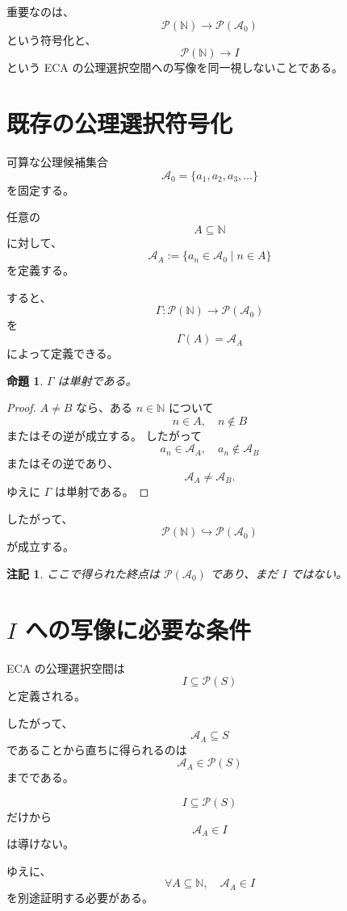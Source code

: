 \documentclass[a4paper,11pt]{article}
\newtheorem{proposition}[definition]{命題}
\newtheorem{remark}[definition]{注記}
\begin{document}
重要なのは、
\[
\mathcal{P}(\mathbb{N})\to\mathcal{P}(\mathcal{A}_0)
\]
という符号化と、
\[
\mathcal{P}(\mathbb{N})\to I
\]
という ECA の公理選択空間への写像を同一視しないことである。

\section{既存の公理選択符号化}

可算な公理候補集合
\[
\mathcal{A}_0=\{a_1,a_2,a_3,\ldots\}
\]
を固定する。

任意の
\[
A\subseteq\mathbb{N}
\]
に対して、
\[
\mathcal{A}_A
:=
\{a_n\in\mathcal{A}_0\mid n\in A\}
\]
を定義する。

すると、
\[
\Gamma:
\mathcal{P}(\mathbb{N})
\longrightarrow
\mathcal{P}(\mathcal{A}_0)
\]
を
\[
\Gamma(A)=\mathcal{A}_A
\]
によって定義できる。

\begin{proposition}
$\Gamma$ は単射である。
\end{proposition}

\begin{proof}
$A\neq B$ なら、ある $n\in\mathbb{N}$ について
\[
n\in A,\quad n\notin B
\]
またはその逆が成立する。
したがって
\[
a_n\in\mathcal{A}_A,\quad
a_n\notin\mathcal{A}_B
\]
またはその逆であり、
\[
\mathcal{A}_A\neq\mathcal{A}_B.
\]
ゆえに $\Gamma$ は単射である。
\end{proof}

したがって、
\[
\boxed{
\mathcal{P}(\mathbb{N})
\hookrightarrow
\mathcal{P}(\mathcal{A}_0)
}
\]
が成立する。

\begin{remark}
ここで得られた終点は $\mathcal{P}(\mathcal{A}_0)$ であり、まだ $I$ ではない。
\end{remark}

\section{$I$ への写像に必要な条件}

ECA の公理選択空間は
\[
I\subseteq\mathcal{P}(S)
\]
と定義される。

したがって、
\[
\mathcal{A}_A\subseteq S
\]
であることから直ちに得られるのは
\[
\mathcal{A}_A\in\mathcal{P}(S)
\]
までである。

\[
I\subseteq\mathcal{P}(S)
\]
だけから
\[
\mathcal{A}_A\in I
\]
は導けない。

ゆえに、
\[
\boxed{
\forall A\subseteq\mathbb{N},\quad
\mathcal{A}_A\in I
}
\]
を別途証明する必要がある。
\end{document}

